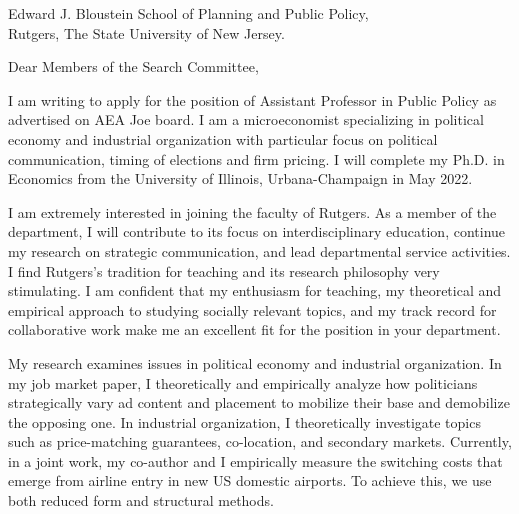\documentclass[12pt]{letter}
\begin{document}
\date{}
\begin{letter}{Edward J. Bloustein School of Planning and Public Policy,\\
Rutgers, The State University of New Jersey.}

\opening{Dear Members of the Search Committee,}

I am writing to apply for the position of Assistant Professor in Public Policy as advertised on AEA Joe board.
I am a microeconomist specializing in political economy and industrial organization with particular focus on political communication, timing of elections and firm pricing.
I will complete my Ph.D. in Economics from the University of Illinois, Urbana-Champaign in May 2022. 

I am extremely interested in joining the faculty of Rutgers.
As a member of the department, I will contribute to its focus on interdisciplinary education,
continue my research on strategic communication, and lead departmental service activities.
%
I find Rutgers's tradition for teaching and its research philosophy very stimulating.
I am confident that my enthusiasm for teaching, my theoretical and empirical approach to studying socially relevant topics, 
and my track record for collaborative work make me an excellent fit for the position in your department. 



My research examines issues in political economy and industrial organization.
In my job market paper, I theoretically and empirically analyze how politicians strategically vary ad content and placement to mobilize their base and demobilize the opposing one.
In industrial organization, I theoretically investigate topics such as price-matching guarantees, co-location, and secondary markets.
Currently, in a joint work, my co-author and I empirically measure the switching costs that emerge from airline entry in new US domestic airports.
To achieve this, we use both reduced form and structural methods.


\end{letter}
\end{document}
